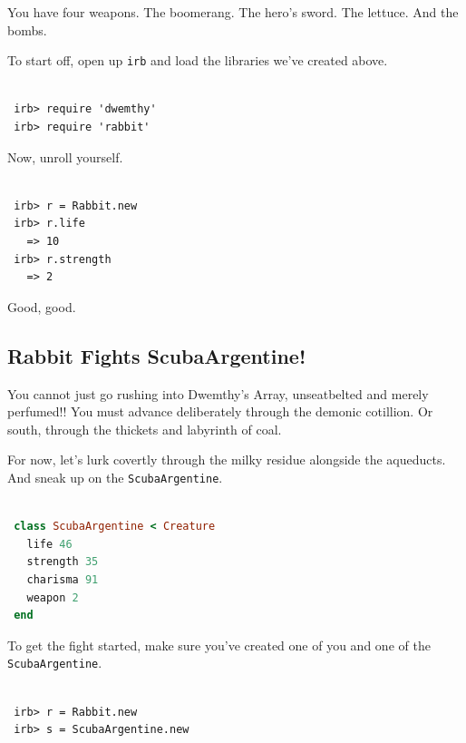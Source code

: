 \documentclass[10pt,twoside]{report}
\begin{document}
You have four weapons.  The boomerang.  The hero's sword.  The
lettuce.  And the bombs.

To start off, open up \lstinline[breaklines=true]|irb| and load the
libraries we've created above.


\begin{lstlisting}

 irb> require 'dwemthy'
 irb> require 'rabbit'

\end{lstlisting}


Now, unroll yourself.


\begin{lstlisting}

 irb> r = Rabbit.new
 irb> r.life
   => 10
 irb> r.strength
   => 2

\end{lstlisting}


Good, good.



\subsection{Rabbit Fights ScubaArgentine!}



You cannot just go rushing into Dwemthy's Array, unseatbelted and
merely perfumed!!  You must advance deliberately through the demonic
cotillion.  Or south, through the thickets and labyrinth of coal.

For now, let's lurk covertly through the milky residue alongside the
aqueducts.  And sneak up on the
\lstinline[breaklines=true]|ScubaArgentine|.


\begin{lstlisting}[basicstyle=\ttfamily\color{basiccolor},
    commentstyle = \ttfamily\color{commentcolor},
    keywordstyle=\ttfamily\color{keywordscolor},
    stringstyle=\color{stringcolor},
    language=Ruby,
    basicstyle=\small\ttfamily,
    showstringspaces=false,
  ]

 class ScubaArgentine < Creature
   life 46
   strength 35
   charisma 91
   weapon 2
 end

\end{lstlisting}


To get the fight started, make sure you've created one of you and one
of the \lstinline[breaklines=true]|ScubaArgentine|.


\begin{lstlisting}

 irb> r = Rabbit.new
 irb> s = ScubaArgentine.new

\end{lstlisting}
\end{document}
